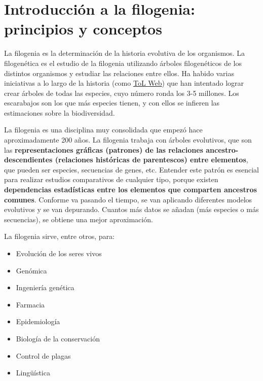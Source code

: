 \chapter{Introducción a la filogenia: principios y conceptos}
La filogenia es la determinación de la historia evolutiva de los organismos. La filogenética es el estudio de la filogenia utilizando árboles filogenéticos de los distintos organismos y estudiar las relaciones entre ellos. Ha habido varias iniciativas a lo largo de la historia (como \href{http://tolweb.org}{ToL Web}) que han intentado lograr crear árboles de todas las especies, cuyo número ronda los 3-5 millones. Los escarabajos son los que más especies tienen, y con ellos se infieren las estimaciones sobre la biodiversidad. 

La filogenia es una disciplina muy consolidada que empezó hace aproximadamente 200 años. La filogenia trabaja con árboles evolutivos, que son las \textbf{representaciones gráficas (patrones) de las relaciones ancestro-descendientes (relaciones históricas de parentescos) entre elementos}, que pueden ser especies, secuencias de genes, etc. Entender este patrón es esencial para realizar estudios comparativos de cualquier tipo, porque existen\textbf{ dependencias estadísticas entre los elementos que comparten ancestros comunes}. Conforme va pasando el tiempo, se van aplicando diferentes modelos evolutivos y se van depurando. Cuantos más datos se añadan (más especies o más secuencias), se obtiene una mejor aproximación.

La filogenia sirve, entre otros, para: \begin{itemize}
\item Evolución de los seres vivos
\item Genómica
\item Ingeniería genética
\item Farmacia
\item Epidemiología
\item Biología de la conservación
\item Control de plagas
\item Lingüística
\end{itemize}

